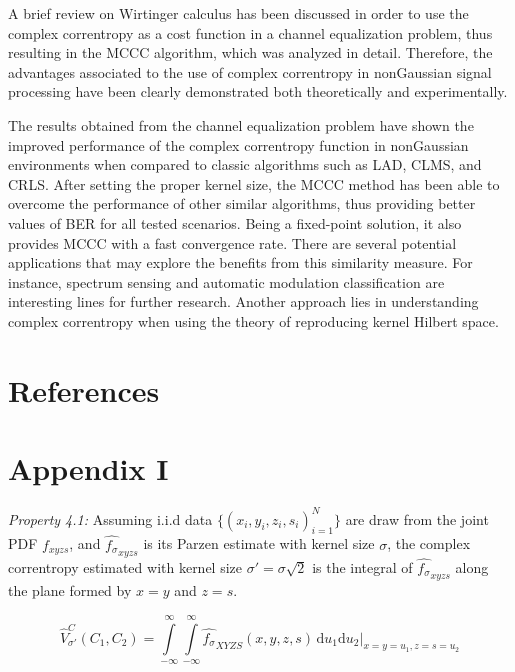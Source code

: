 \documentclass[preprint,12pt]{elsarticle}
\begin{document}
A brief review on Wirtinger calculus has been discussed in order to use the complex correntropy as a cost function in a channel equalization problem, thus resulting in the MCCC algorithm, which was analyzed in detail. Therefore, the advantages associated to the use of complex correntropy in nonGaussian signal processing have been clearly demonstrated both theoretically and experimentally. 



The results obtained from the channel equalization problem have shown the improved performance of the complex correntropy function in nonGaussian environments when compared to classic algorithms such as LAD, CLMS, and CRLS. After setting the proper kernel size, the MCCC method has been able to overcome the performance of other similar algorithms, thus providing better values of BER for all tested scenarios. Being a fixed-point solution, it also provides MCCC with a fast convergence rate. There are several potential applications that may explore the benefits from this similarity measure. For instance, spectrum sensing and automatic modulation classification are interesting lines for further research. Another approach lies in understanding complex correntropy when using the theory of reproducing kernel Hilbert space. 





\section*{References}



\newpage
\section*{Appendix I}

\textit{Property 4.1:} Assuming i.i.d data $\{ ( x_i,y_i,z_i,s_i )_{i=1}^N \}$ are draw from the joint PDF $f_{xyzs}$, and $\hat{f_{\sigma}}_{xyzs}$ is its Parzen estimate with kernel size $\sigma$, the complex correntropy estimated with kernel size $\sigma' = \sigma \sqrt{2}$ is the integral of $\hat{f_{\sigma}}_{xyzs}$ along the plane formed by $x=y$ and $z=s$. 



\begin{equation}\label{querseprovar}
\hat{V}^{C}_{\sigma'}(C_1,C_2) = \int\limits_{-\infty}^{\infty} \int\limits_{-\infty}^{\infty}  \! \hat{f_{\sigma}}_{XYZS}(x,y,z,s) \, \mathrm{d}u_{1}\mathrm{d}u_{2} \Big|_{x=y=u_{1}, z=s=u_{2}}
\end{equation}
\end{document}
